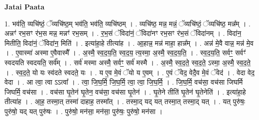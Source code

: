 \documentclass[17pt]{extarticle}
\begin{document}
\textbf{Jatai Paata} \newline

1. भव॑ति॒ व्यचि॑ष्ठं॒ ॅव्यचि॑ष्ठ॒म् भव॑ति॒ भव॑ति॒ व्यचि॑ष्ठम् । . व्यचि॑ष्ठ॒ मन्न॒ मन्नं॒ ॅव्यचि॑ष्ठं॒ ॅव्यचि॑ष्ठ॒ मन्न᳚म् । . अन्नꣳ॑ रभ॒सꣳ र॑भ॒स मन्न॒ मन्नꣳ॑ रभ॒सम् । . र॒भ॒सं ॅविदा॑नं॒ ॅविदा॑नꣳ रभ॒सꣳ र॑भ॒सं ॅविदा॑नम् । . विदा॑न॒ मितीति॒ विदा॑नं॒ ॅविदा॑न॒ मिति॑ । . इत्या॑हा॒हे तीत्या॑ह । . आ॒हान्न॒ मन्न॑ माहा॒ हान्न᳚म् । . अन्न॑ मे॒वै वान्न॒ मन्न॑ मे॒व । . ए॒वास्मा॑ अस्मा ए॒वैवास्मै᳚ । . अ॒स्मै॒ स्व॒द॒य॒ति॒ स्व॒द॒य॒ त्य॒स्मा॒ अ॒स्मै॒ स्व॒द॒य॒ति॒ । . स्व॒द॒य॒ति॒ सर्वꣳ॒॒ सर्वꣳ॑ स्वदयति स्वदयति॒ सर्व᳚म् । . सर्व॑ मस्मा अस्मै॒ सर्वꣳ॒॒ सर्व॑ मस्मै । . अ॒स्मै॒ स्व॒द॒ते॒ स्व॒द॒ते॒ ऽस्मा॒ अ॒स्मै॒ स्व॒द॒ते॒ । . स्व॒द॒ते॒ यो यः स्व॑दते स्वदते॒ यः । . य ए॒व मे॒वं ॅयो य ए॒वम् । . ए॒वं ॅवेद॒ वेदै॒व मे॒वं ॅवेद॑ । . वेदा वेद॒ वेदा । . आ त्वा॒ त्वा ऽऽत्वा᳚ । . त्वा॒ जि॒घ॒र्मि॒ जि॒घ॒र्मि॒ त्वा॒ त्वा॒ जि॒घ॒र्मि॒ । . जि॒घ॒र्मि॒ वच॑सा॒ वच॑सा जिघर्मि जिघर्मि॒ वच॑सा । . वच॑सा घृ॒तेन॑ घृ॒तेन॒ वच॑सा॒ वच॑सा घृ॒तेन॑ । . घृ॒तेने तीति॑ घृ॒तेन॑ घृ॒तेनेति॑ । . इत्या॑हा॒हे तीत्या॑ह । . आ॒ह॒ तस्मा॒त् तस्मा॑ दाहाह॒ तस्मा᳚त् । . तस्मा॒द् यद् यत् तस्मा॒त् तस्मा॒द् यत् । . यत् पुरु॑षः॒ पुरु॑षो॒ यद् यत् पुरु॑षः । . पुरु॑षो॒ मन॑सा॒ मन॑सा॒ पुरु॑षः॒ पुरु॑षो॒ मन॑सा । \newline
\end{document}
